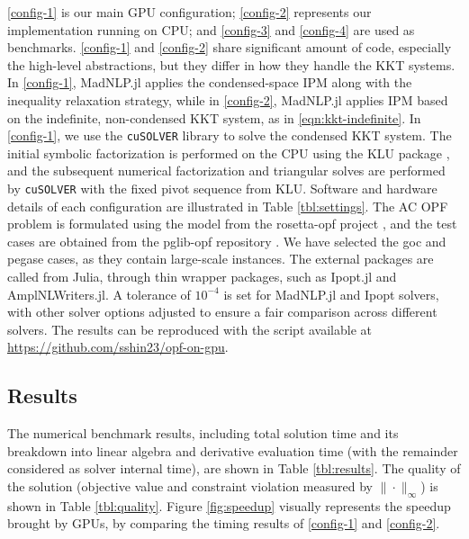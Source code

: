 \ref{config-1} is our main GPU configuration; \ref{config-2}
represents our implementation running on CPU; and \ref{config-3} and
\ref{config-4} are used as benchmarks. \ref{config-1} and
\ref{config-2} share significant amount of code, especially the
high-level abstractions, but they differ in how they handle the KKT
systems. In \ref{config-1}, MadNLP.jl applies the condensed-space IPM
along with the inequality relaxation strategy, while in
\ref{config-2}, MadNLP.jl applies IPM based on the indefinite,
non-condensed KKT system, as in \eqref{eqn:kkt-indefinite}. In
\ref{config-1}, we use the {\tt cuSOLVER} library to solve the condensed KKT
system. The initial symbolic factorization is performed on the CPU using the KLU
package \cite{davis2010algorithm}, and the subsequent numerical
factorization and triangular solves are performed by {\tt cuSOLVER} with the
fixed pivot sequence from KLU.  Software and hardware details of each
configuration are illustrated in Table \ref{tbl:settings}. The AC OPF
problem is formulated using the model from the rosetta-opf project
\cite{rosetta-opf}, and the test cases are obtained from the pglib-opf
repository \cite{babaeinejadsarookolaee2019power}. We have selected
the goc and pegase cases, as they contain large-scale instances.  The
external packages are called from Julia, through thin wrapper
packages, such as Ipopt.jl and AmplNLWriters.jl. A tolerance of
$10^{-4}$ is set for MadNLP.jl and Ipopt solvers, with other solver
options adjusted to ensure a fair comparison across different
solvers. The results can be reproduced with the script available at
\url{https://github.com/sshin23/opf-on-gpu}.

\subsection{Results}

The numerical benchmark results, including total solution time and its
breakdown into linear algebra and derivative evaluation time (with the
remainder considered as solver internal time), are shown in Table
\ref{tbl:results}. The quality of the solution (objective value and
constraint violation measured by $\|\cdot\|_\infty$) is shown in Table
\ref{tbl:quality}. Figure \ref{fig:speedup} visually represents the
speedup brought by GPUs, by comparing the timing results of
\ref{config-1} and \ref{config-2}.



